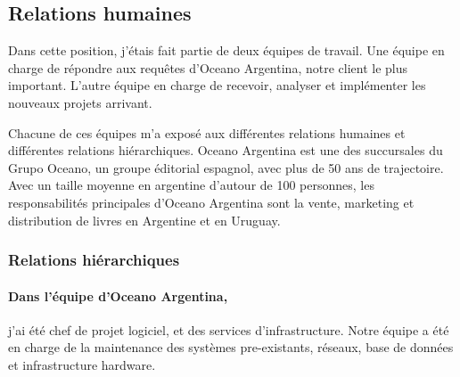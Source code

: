 \documentclass{resume} %
\begin{document}
\subsection{Relations humaines} 

Dans cette position, j'étais fait partie de deux équipes de travail. Une équipe en charge de répondre aux  requêtes d'Oceano Argentina,  notre client le plus important. 
L'autre équipe en charge de recevoir, analyser et implémenter les nouveaux projets arrivant. 

Chacune de ces équipes m'a exposé aux différentes relations humaines et différentes relations hiérarchiques.  
Oceano Argentina est une des succursales du Grupo Oceano, un groupe éditorial espagnol, avec plus de 50 ans de trajectoire. 
Avec un taille moyenne en argentine d'autour de 100 personnes, les responsabilités principales d'Oceano Argentina sont la vente, marketing et distribution de livres en Argentine et en Uruguay. 

	
	\subsubsection{Relations hiérarchiques} 
	

		\paragraph{Dans l'équipe d'Oceano Argentina,} j'ai été chef de projet logiciel, et des services d'infrastructure.  Notre équipe a été en charge de la maintenance des systèmes pre-existants, réseaux, base de données et infrastructure hardware. 
		
\end{document}
